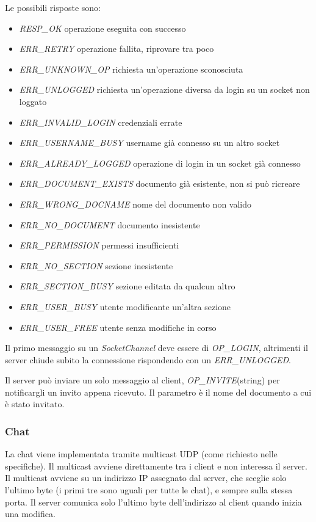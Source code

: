 \documentclass[a4paper]{article}
\theoremstyle{theorem}
\theoremstyle{remark}
\theoremstyle{definition}
\theoremstyle{corollary}
\theoremstyle{lemma}
\begin{document}
Le possibili risposte sono:
\begin{itemize}
	\item \textit{RESP\_OK} operazione eseguita con successo
	\item \textit{ERR\_RETRY} operazione fallita, riprovare tra poco
	\item \textit{ERR\_UNKNOWN\_OP} richiesta un'operazione sconosciuta
	\item \textit{ERR\_UNLOGGED} richiesta un'operazione diversa da login su un socket non loggato
	\item \textit{ERR\_INVALID\_LOGIN} credenziali errate
	\item \textit{ERR\_USERNAME\_BUSY} username già connesso su un altro socket
	\item \textit{ERR\_ALREADY\_LOGGED} operazione di login in un socket già connesso
	\item \textit{ERR\_DOCUMENT\_EXISTS} documento già esistente, non si può ricreare
	\item \textit{ERR\_WRONG\_DOCNAME} nome del documento non valido
	\item \textit{ERR\_NO\_DOCUMENT} documento inesistente
	\item \textit{ERR\_PERMISSION} permessi insufficienti
	\item \textit{ERR\_NO\_SECTION} sezione inesistente
	\item \textit{ERR\_SECTION\_BUSY} sezione editata da qualcun altro
	\item \textit{ERR\_USER\_BUSY} utente modificante un'altra sezione
	\item \textit{ERR\_USER\_FREE} utente senza modifiche in corso
\end{itemize}

Il primo messaggio su un \textit{SocketChannel} deve essere di \textit{OP\_LOGIN}, altrimenti il server chiude subito la connessione rispondendo con un \textit{ERR\_UNLOGGED}.

Il server può inviare un solo messaggio al client, \textit{OP\_INVITE}(string) per notificargli un invito appena ricevuto. Il parametro è il nome del documento a cui è stato invitato.

\subsubsection{Chat}
La chat viene implementata tramite multicast UDP (come richiesto nelle specifiche). Il multicast avviene direttamente tra i client e non interessa il server. Il multicast avviene su un indirizzo IP assegnato dal server, che sceglie solo l'ultimo byte (i primi tre sono uguali per tutte le chat), e sempre sulla stessa porta. Il server comunica solo l'ultimo byte dell'indirizzo al client quando inizia una modifica.
\end{document}
